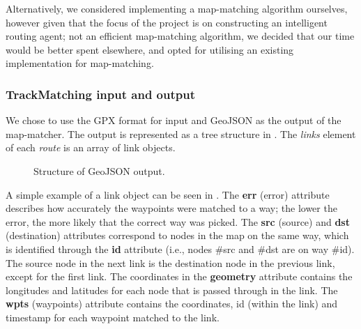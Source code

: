 Alternatively, we considered implementing a map-matching algorithm ourselves, however given that the focus of the project is on constructing an intelligent routing agent; not an efficient map-matching algorithm, we decided that our time would be better spent elsewhere, and opted for utilising an existing implementation for map-matching.

\subsubsection{TrackMatching input and output}
We chose to use the GPX format for input and GeoJSON as the output of the map-matcher. The output is represented as a tree structure in . The \emph{links} element of each \emph{route} is an array of link objects.

\begin{figure}[H]
	\centering
	\caption{Structure of GeoJSON output.}
	\label{fig:geojson}
\end{figure}

A simple example of a link object can be seen in . The \textbf{err} (error) attribute describes how accurately the waypoints were matched to a way; the lower the error, the more likely that the correct way was picked. The \textbf{src} (source) and \textbf{dst} (destination) attributes correspond to nodes in the map on the same way, which is identified through the \textbf{id} attribute (i.e., nodes \#src and \#dst are on way \#id). The source node in the next link is the destination node in the previous link, except for the first link. The coordinates in the \textbf{geometry} attribute contains the longitudes and latitudes for each node that is passed through in the link. The \textbf{wpts} (waypoints) attribute contains the coordinates, id (within the link) and timestamp for each waypoint matched to the link. 

